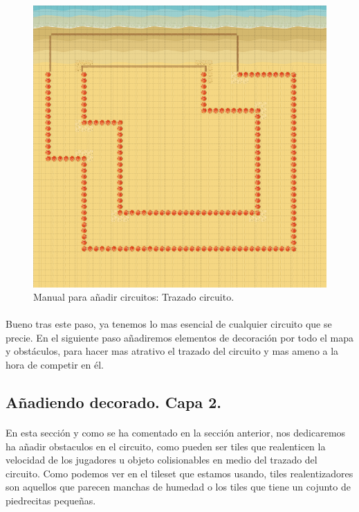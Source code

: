 \begin{figure}[H]
  \label{circuito_trazado}
  \begin{center}
    \includegraphics[scale=0.5]{imagenes/manualcircuito/circuito_trazado.png}
  \end{center}
  \caption{Manual para añadir circuitos: Trazado circuito.}
\end{figure}

\paragraph{}
Bueno tras este paso, ya tenemos lo mas esencial de cualquier circuito que se precie. En el siguiente paso añadiremos elementos
de decoración por todo el mapa y obstáculos, para hacer mas atrativo el trazado del circuito y mas ameno a la hora de 
competir en él.

\subsection{Añadiendo decorado. Capa 2.}

\paragraph{}
En esta sección y como se ha comentado en la sección anterior, nos dedicaremos ha añadir obstaculos en el circuito, como pueden ser
tiles que realenticen la velocidad de los jugadores u objeto colisionables en medio del trazado del circuito. Como podemos ver en
el tileset que estamos usando, tiles realentizadores son aquellos que parecen manchas de humedad o los tiles que tiene un cojunto 
de piedrecitas pequeñas.

